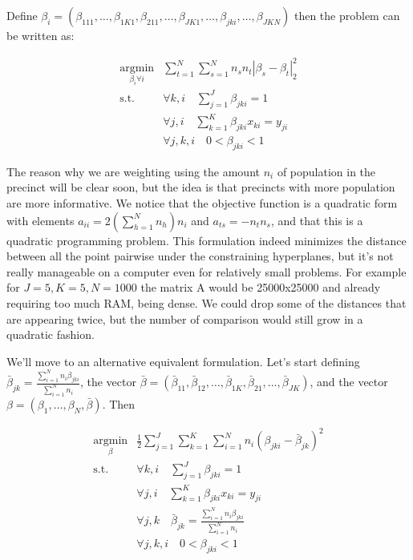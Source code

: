 \documentclass{article}
\begin{document}
Define $\beta_i=(\beta_{111},\ldots,\beta_{1K1},\beta_{211},\ldots,\beta_{JK1},\ldots,\beta_{jki},\ldots,\beta_{JKN})$ then the problem can be written as:

\begin{align*}
\underset{\beta_i \forall i}{\text{arg}\min}& \sum_{t=1}^{N} \sum_{s=1}^{N} n_s n_t |\beta_s -\beta_t|_2^2\\
\text{s.t. }& \forall k,i\quad \sum_{j=1}^{J}\beta_{jki}=1\\
 		    & \forall j,i\quad \sum_{k=1}^{K}\beta_{jki}x_{ki}=y_{ji}\\
 		    & \forall j,k,i\quad  0<\beta_{jki}<1
\end{align*}

The reason why we are weighting using the amount $n_i$ of population in the precinct will be clear soon, but the idea is that precincts with more population are more informative. We notice that the objective function is a quadratic form with elements $a_{ii}=2(\sum_{h=1}^{N} n_h)n_i$ and $a_{ts}= -n_t n_s$, and that this is a quadratic programming problem. This formulation indeed minimizes the distance between all the point pairwise under the constraining hyperplanes, but it's not really manageable on a computer even for relatively small problems. For example for $J=5,K=5,N=1000$ the matrix A would be 25000x25000 and already requiring too much RAM, being dense. We could drop some of the distances that are appearing twice, but the number of comparison would still grow in a quadratic fashion.

We'll move to an alternative equivalent formulation. Let's start defining $\bar{\beta}_{jk}=\frac{\sum_{i=1}^{N} n_i \beta_{jki}}{\sum_{i=1}^{N} n_i}$, the vector $\bar{\beta}=(\bar{\beta}_{11},\bar{\beta}_{12},\ldots,\bar{\beta}_{1K},\bar{\beta}_{21},\ldots,\bar{\beta}_{JK})$, and the vector $\beta=(\beta_1,\ldots,\beta_N,\bar{\beta})$. Then

\begin{align*}
\underset{\beta}{\text{arg}\min}& \frac{1}{2}\sum_{j=1}^{J}\sum_{k=1}^{K}\sum_{i=1}^{N} n_i (\beta_{jki} -\bar{\beta}_{jk})^2\\
\text{s.t. }& \forall k,i\quad \sum_{j=1}^{J}\beta_{jki}=1\\
 		    & \forall j,i\quad \sum_{k=1}^{K}\beta_{jki}x_{ki}=y_{ji}\\
 		    & \forall j,k\quad \bar{\beta}_{jk}=\frac{\sum_{i=1}^{N} n_i \beta_{jki}}{\sum_{i=1}^{N} n_i}\\
 		    & \forall j,k,i\quad  0<\beta_{jki}<1
\end{align*}
\end{document}
